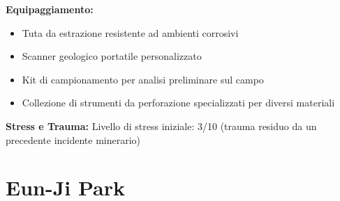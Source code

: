 \documentclass[11pt,a4paper]{article}
\begin{document}
\begin{tcolorbox}[colback=mininglightorange!20, colframe=miningorange]
\textbf{Equipaggiamento:}
\begin{itemize}[leftmargin=*]
\item Tuta da estrazione resistente ad ambienti corrosivi
\item Scanner geologico portatile personalizzato
\item Kit di campionamento per analisi preliminare sul campo
\item Collezione di strumenti da perforazione specializzati per diversi materiali
\end{itemize}

\textbf{Stress e Trauma:} Livello di stress iniziale: 3/10 (trauma residuo da un precedente incidente minerario)
\end{tcolorbox}

\section{Eun-Ji Park}
\end{document}
